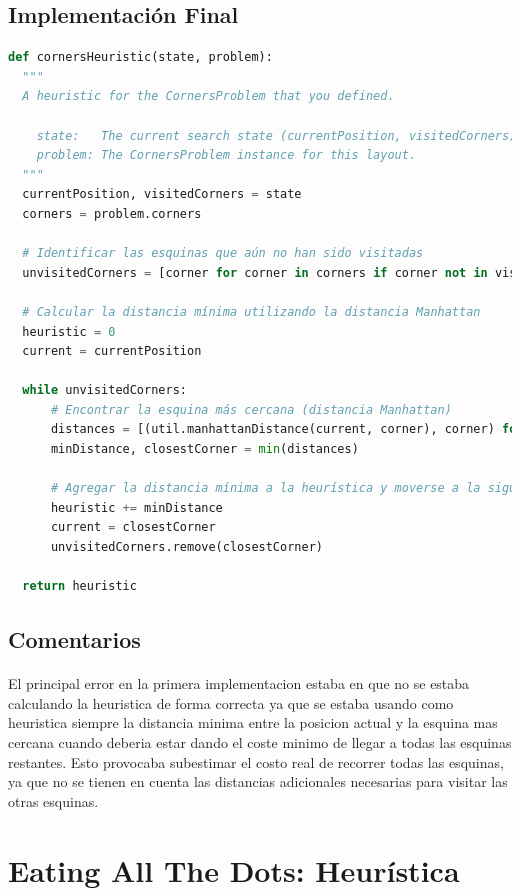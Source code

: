 \documentclass{report}
\begin{document}
        \subsection*{Implementación Final}
          \begin{lstlisting}[language=Python, caption=Implementación final de la heurística del problema de las esquinas]
def cornersHeuristic(state, problem):
  """
  A heuristic for the CornersProblem that you defined.

    state:   The current search state (currentPosition, visitedCorners)
    problem: The CornersProblem instance for this layout.
  """
  currentPosition, visitedCorners = state
  corners = problem.corners

  # Identificar las esquinas que aún no han sido visitadas
  unvisitedCorners = [corner for corner in corners if corner not in visitedCorners]

  # Calcular la distancia mínima utilizando la distancia Manhattan
  heuristic = 0
  current = currentPosition

  while unvisitedCorners:
      # Encontrar la esquina más cercana (distancia Manhattan)
      distances = [(util.manhattanDistance(current, corner), corner) for corner in unvisitedCorners]
      minDistance, closestCorner = min(distances)
      
      # Agregar la distancia mínima a la heurística y moverse a la siguiente esquina
      heuristic += minDistance
      current = closestCorner
      unvisitedCorners.remove(closestCorner)

  return heuristic        
          \end{lstlisting}
        \subsection*{Comentarios}
          \paragraph*{}{
            El principal error en la primera implementacion estaba en que no se estaba calculando la heuristica de forma correcta ya que se estaba usando como heuristica siempre la distancia minima entre la posicion actual y la esquina mas cercana cuando deberia estar dando el coste minimo de llegar a todas las esquinas restantes.
            Esto provocaba subestimar el costo real de recorrer todas las esquinas, ya que no se tienen en cuenta las distancias adicionales necesarias para visitar las otras esquinas.
          }
      \clearpage\section{Eating All The Dots: Heurística}
\end{document}
